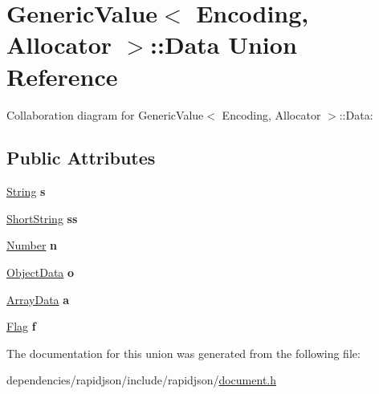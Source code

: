 \hypertarget{union_generic_value_1_1_data}{}\section{Generic\+Value$<$ Encoding, Allocator $>$\+:\+:Data Union Reference}
\label{union_generic_value_1_1_data}


Collaboration diagram for Generic\+Value$<$ Encoding, Allocator $>$\+:\+:Data\+:
\subsection*{Public Attributes}
\begin{DoxyCompactItemize}
\item 
\mbox{\label{union_generic_value_1_1_data_a6872a4b93763944063b425e6c001ed2b}} 
\hyperlink{struct_generic_value_1_1_string}{String} {\bfseries s}
\item 
\mbox{\label{union_generic_value_1_1_data_a410e39a5dc296eb3b152b54193740e4c}} 
\hyperlink{struct_generic_value_1_1_short_string}{Short\+String} {\bfseries ss}
\item 
\mbox{\label{union_generic_value_1_1_data_a243007cce2f4b75bea3e3c1ee4c3c239}} 
\hyperlink{union_generic_value_1_1_number}{Number} {\bfseries n}
\item 
\mbox{\label{union_generic_value_1_1_data_af6417eca530fba0d8bd65d309628eb11}} 
\hyperlink{struct_generic_value_1_1_object_data}{Object\+Data} {\bfseries o}
\item 
\mbox{\label{union_generic_value_1_1_data_aeac31cf55bf5a024cead5ecb63e4fd48}} 
\hyperlink{struct_generic_value_1_1_array_data}{Array\+Data} {\bfseries a}
\item 
\mbox{\label{union_generic_value_1_1_data_ad8572112da083c775ce21bcbca96b2ab}} 
\hyperlink{struct_generic_value_1_1_flag}{Flag} {\bfseries f}
\end{DoxyCompactItemize}


The documentation for this union was generated from the following file\+:\begin{DoxyCompactItemize}
\item 
dependencies/rapidjson/include/rapidjson/\hyperlink{document_8h}{document.\+h}\end{DoxyCompactItemize}
